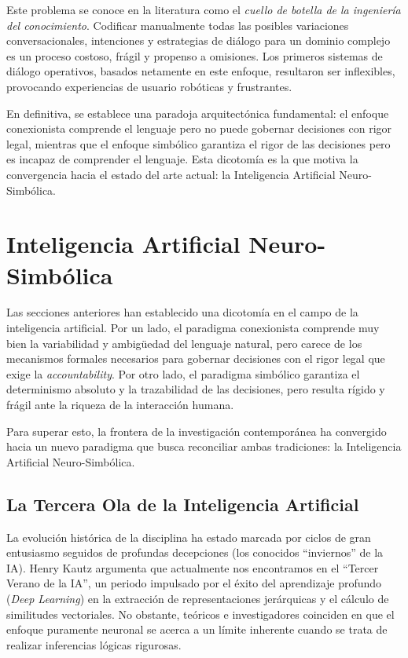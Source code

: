 \documentclass[12pt,a4paper]{report}
\begin{document}
Este problema se conoce en la literatura como el \textit{cuello de botella de la ingeniería del conocimiento}. Codificar manualmente todas las posibles variaciones conversacionales, intenciones y estrategias de diálogo para un dominio complejo es un proceso costoso, frágil y propenso a omisiones. Los primeros sistemas de diálogo operativos, basados netamente en este enfoque, resultaron ser inflexibles, provocando experiencias de usuario robóticas y frustrantes.

En definitiva, se establece una paradoja arquitectónica fundamental: el enfoque conexionista comprende el lenguaje pero no puede gobernar decisiones con rigor legal, mientras que el enfoque simbólico garantiza el rigor de las decisiones pero es incapaz de comprender el lenguaje. Esta dicotomía es la que motiva la convergencia hacia el estado del arte actual: la Inteligencia Artificial Neuro-Simbólica.

\section{Inteligencia Artificial Neuro-Simbólica}

Las secciones anteriores han establecido una dicotomía en el campo de la inteligencia artificial. Por un lado, el paradigma conexionista comprende muy bien la variabilidad y ambigüedad del lenguaje natural, pero carece de los mecanismos formales necesarios para gobernar decisiones con el rigor legal que exige la \textit{accountability}. Por otro lado, el paradigma simbólico garantiza el determinismo absoluto y la trazabilidad de las decisiones, pero resulta rígido y frágil ante la riqueza de la interacción humana.

Para superar esto, la frontera de la investigación contemporánea ha convergido hacia un nuevo paradigma que busca reconciliar ambas tradiciones: la Inteligencia Artificial Neuro-Simbólica.

\subsection{La Tercera Ola de la Inteligencia Artificial}

La evolución histórica de la disciplina ha estado marcada por ciclos de gran entusiasmo seguidos de profundas decepciones (los conocidos ``inviernos'' de la IA). Henry Kautz \cite{kautz2022thirdsummer} argumenta que actualmente nos encontramos en el ``Tercer Verano de la IA'', un periodo impulsado por el éxito del aprendizaje profundo (\textit{Deep Learning}) en la extracción de representaciones jerárquicas y el cálculo de similitudes vectoriales. No obstante, teóricos e investigadores coinciden en que el enfoque puramente neuronal se acerca a un límite inherente cuando se trata de realizar inferencias lógicas rigurosas.
\end{document}
